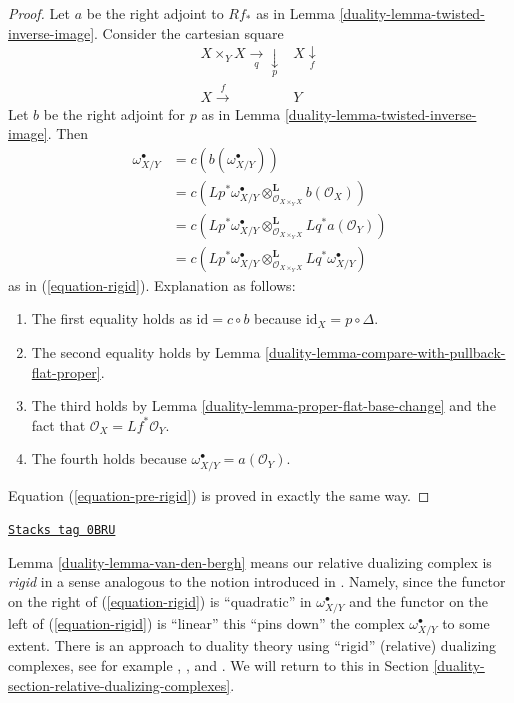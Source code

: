 \begin{proof}

Let $a$ be the right adjoint to $Rf_*$ as in
Lemma \ref{duality-lemma-twisted-inverse-image}.
Consider the cartesian square
$$
\begin{array}{cc}X \times_Y X \underset{q}{\longrightarrow}\underset{p}{\downarrow} & X \underset{f}{\downarrow} \\ X \overset{f}{\longrightarrow} & Y\end{array}
$$
Let $b$ be the right adjoint for $p$
as in Lemma \ref{duality-lemma-twisted-inverse-image}. Then
\begin{align*}
\omega_{X/Y}^\bullet
& =
c(b(\omega_{X/Y}^\bullet)) \\
& =
c(Lp^*\omega_{X/Y}^\bullet
\otimes_{\mathcal{O}_{X \times_Y X}}^\mathbf{L} b(\mathcal{O}_X)) \\
& =
c(Lp^*\omega_{X/Y}^\bullet
\otimes_{\mathcal{O}_{X \times_Y X}}^\mathbf{L}
Lq^*a(\mathcal{O}_Y)) \\
& =
c(Lp^*\omega_{X/Y}^\bullet
\otimes_{\mathcal{O}_{X \times_Y X}}^\mathbf{L}
Lq^*\omega_{X/Y}^\bullet)
\end{align*}
as in (\ref{equation-rigid}). Explanation as follows:
\begin{enumerate}
\item The first equality holds as $\text{id} = c \circ b$ because
$\text{id}_X = p \circ \Delta$.
\item The second equality holds by
Lemma \ref{duality-lemma-compare-with-pullback-flat-proper}.
\item The third holds by Lemma \ref{duality-lemma-proper-flat-base-change}
and the fact that $\mathcal{O}_X = Lf^*\mathcal{O}_Y$.
\item The fourth holds because $\omega_{X/Y}^\bullet = a(\mathcal{O}_Y)$.
\end{enumerate}
Equation (\ref{equation-pre-rigid}) is proved in exactly the same way.
\end{proof}

\begin{remark}
\label{duality-remark-van-den-bergh}
\href{https://stacks.math.columbia.edu/tag/0BRU}{\texttt{Stacks tag 0BRU}}

Lemma \ref{duality-lemma-van-den-bergh} means our relative dualizing
complex is {\it rigid} in a sense analogous to the notion introduced
in \cite{vdB-rigid}. Namely, since the functor on the right of
(\ref{equation-rigid})
is ``quadratic'' in $\omega_{X/Y}^\bullet$ and the functor on the left
of (\ref{equation-rigid})
is ``linear'' this ``pins down'' the complex $\omega_{X/Y}^\bullet$
to some extent. There is an approach to duality theory using
``rigid'' (relative) dualizing complexes, see for example
\cite{Neeman-rigid}, \cite{Yekutieli-rigid}, and \cite{Yekutieli-Zhang}.
We will return to this in Section \ref{duality-section-relative-dualizing-complexes}.
\end{remark}

